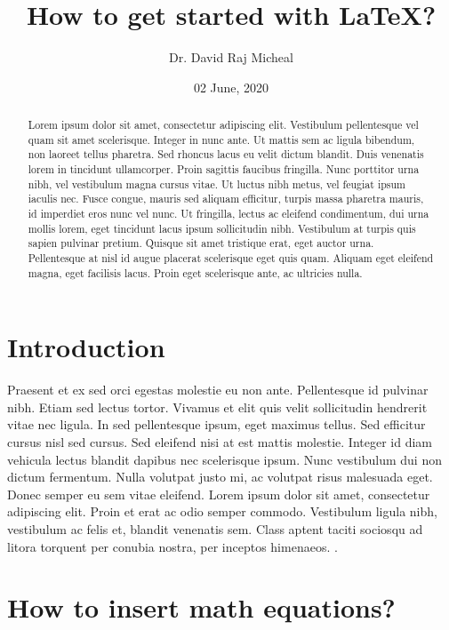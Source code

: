 \documentclass[a4paper,12pt]{article}
\begin{document}
	
\title{\textbf{How to get started with \LaTeX?}}
\author{Dr. David Raj Micheal}
\date{02 June, 2020}

\maketitle

\begin{abstract}
Lorem ipsum dolor sit amet, consectetur adipiscing elit. Vestibulum pellentesque vel quam sit amet scelerisque. Integer in nunc ante. Ut mattis sem ac ligula bibendum, non laoreet tellus pharetra. Sed rhoncus lacus eu velit dictum blandit. Duis venenatis lorem in tincidunt ullamcorper. Proin sagittis faucibus fringilla. Nunc porttitor urna nibh, vel vestibulum magna cursus vitae. Ut luctus nibh metus, vel feugiat ipsum iaculis nec. Fusce congue, mauris sed aliquam efficitur, turpis massa pharetra mauris, id imperdiet eros nunc vel nunc. Ut fringilla, lectus ac eleifend condimentum, dui urna mollis lorem, eget tincidunt lacus ipsum sollicitudin nibh. Vestibulum at turpis quis sapien pulvinar pretium. Quisque sit amet tristique erat, eget auctor urna. Pellentesque at nisl id augue placerat scelerisque eget quis quam. Aliquam eget eleifend magna, eget facilisis lacus. Proin eget scelerisque ante, ac ultricies nulla.
\end{abstract}

\tableofcontents


\section{Introduction}

Praesent et ex sed orci egestas molestie eu non ante. Pellentesque id pulvinar nibh. Etiam sed lectus tortor. Vivamus et elit quis velit sollicitudin hendrerit vitae nec ligula. In sed pellentesque ipsum, eget maximus tellus. Sed efficitur cursus nisl sed cursus. Sed eleifend nisi at est mattis molestie. Integer id diam vehicula lectus blandit dapibus nec scelerisque ipsum. Nunc vestibulum dui non dictum fermentum. Nulla volutpat justo mi, ac volutpat risus malesuada eget. Donec semper eu sem vitae eleifend. Lorem ipsum dolor sit amet, consectetur adipiscing elit. Proin et erat ac odio semper commodo. Vestibulum ligula nibh, vestibulum ac felis et, blandit venenatis sem. Class aptent taciti sociosqu ad litora torquent per conubia nostra, per inceptos himenaeos. \cite{arthur2003}.


\section{How to insert math equations?}
\end{document}
